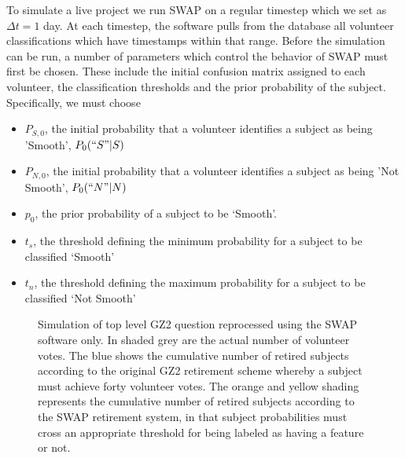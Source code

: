 \documentclass[twocolumn]{aastex6}
\newcommand{\Ps}{$P_{S,0}$}
\newcommand{\Pn}{$P_{N,0}$}
\newcommand{\ts}{$t_s$}
\newcommand{\tn}{$t_n$}
\begin{document}
To simulate a live project we run SWAP on a regular timestep which we set as $\Delta t = 1$ day. 
At each timestep, the software pulls from the database all volunteer classifications which
have timestamps within that range. Before the simulation can be run, a number 
of parameters which control the behavior of SWAP must first be chosen. These include
 the initial confusion matrix assigned to each volunteer, the classification
thresholds and the prior probability of the subject. Specifically, we must choose 
\begin{itemize}
\item \Ps, the initial probability that a volunteer identifies a subject as being 'Smooth', $P_0(``S"|S)$
\item \Pn, the initial probability that a volunteer identifies a subject as being 'Not Smooth', $P_0(``N"|N)$
\item $p_0$, the prior probability of a subject to be `Smooth'.
\item \ts, the threshold defining the minimum probability for a subject to be classified `Smooth'
\item \tn, the threshold defining the maximum probability for a subject to be classified `Not Smooth'
\end{itemize}


\begin{figure}[ht!]
\caption{Simulation of top level GZ2 question reprocessed using the SWAP software only. In shaded grey are the actual number of volunteer votes. The blue shows the cumulative number of retired subjects according to the original GZ2 retirement scheme whereby a subject must achieve forty volunteer votes. The orange and yellow shading represents the cumulative number of retired subjects according to the SWAP retirement system, in that subject probabilities must cross an appropriate threshold for being labeled as having a feature or not. \label{fig: swapresults}}
\end{figure}
\end{document}
